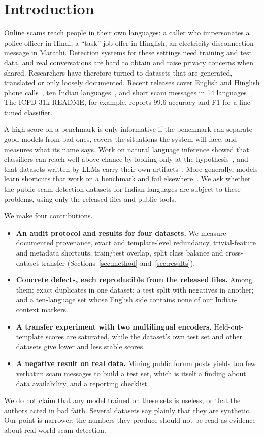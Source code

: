 \documentclass[conference]{IEEEtran}
\begin{document}
\section{Introduction}
Online scams reach people in their own languages: a caller who impersonates a police officer in Hindi, a ``task'' job offer in Hinglish, an electricity-disconnection message in Marathi. Detection systems for these settings need training and test data, and real conversations are hard to obtain and raise privacy concerns when shared. Researchers have therefore turned to datasets that are generated, translated or only loosely documented. Recent releases cover English and Hinglish phone calls~\cite{ahuja2026icfd}, ten Indian languages~\cite{indicadata}, and short scam messages in 14 languages~\cite{ham14data}. The ICFD-31k README, for example, reports 99.6 accuracy and F1 for a fine-tuned classifier.

A high score on a benchmark is only informative if the benchmark can separate good models from bad ones, covers the situations the system will face, and measures what its name says. Work on natural language inference showed that classifiers can reach well above chance by looking only at the hypothesis~\cite{gururangan2018annotation,poliak2018hypothesis}, and that datasets written by LLMs carry their own artifacts~\cite{proebsting2024hypothesis}. More generally, models learn shortcuts that work on a benchmark and fail elsewhere~\cite{geirhos2020shortcut}. We ask whether the public scam-detection datasets for Indian languages are subject to these problems, using only the released files and public tools.

We make four contributions.
\begin{itemize}
\item \textbf{An audit protocol and results for four datasets.} We measure documented provenance, exact and template-level redundancy, trivial-feature and metadata shortcuts, train/test overlap, split class balance and cross-dataset transfer (Sections~\ref{sec:method} and~\ref{sec:results}).
\item \textbf{Concrete defects, each reproducible from the released files.} Among them: \HkDupPct{} exact duplicates in one dataset; a test split with \IcfdTeNormal{} negatives in another; and a ten-language set whose English side contains none of our Indian-context markers.
\item \textbf{A transfer experiment with two multilingual encoders.} Held-out-template scores are saturated, while the dataset's own test set and other datasets give lower and less stable scores.
\item \textbf{A negative result on real data.} Mining public forum posts yields too few verbatim scam messages to build a test set, which is itself a finding about data availability, and a reporting checklist.
\end{itemize}
We do not claim that any model trained on these sets is useless, or that the authors acted in bad faith. Several datasets say plainly that they are synthetic. Our point is narrower: the numbers they produce should not be read as evidence about real-world scam detection.
\end{document}
